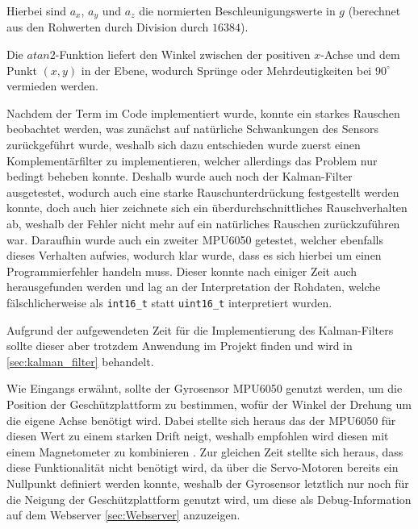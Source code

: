 Hierbei sind $a_x$, $a_y$ und $a_z$ die normierten Beschleunigungswerte in $\mathit{g}$ (berechnet aus den Rohwerten durch Division durch $16384$). 

Die $atan2$-Funktion liefert den Winkel zwischen der positiven $x$-Achse und dem Punkt $(x, y)$ in der Ebene, wodurch Sprünge oder Mehrdeutigkeiten bei $90^\circ$ vermieden werden. \cite{raspberry_matlab_atan2}

Nachdem der Term im Code implementiert wurde, konnte ein starkes Rauschen beobachtet werden, was zunächst auf natürliche Schwankungen des Sensors zurückgeführt wurde, weshalb sich dazu entschieden wurde zuerst einen Komplementärfilter zu implementieren,
welcher allerdings das Problem nur bedingt beheben konnte. Deshalb wurde auch noch der Kalman-Filter ausgetestet, wodurch auch eine starke  Rauschunterdrückung festgestellt werden konnte, doch auch hier zeichnete sich ein überdurchschnittliches Rauschverhalten ab, weshalb der Fehler nicht mehr auf ein natürliches Rauschen zurückzuführen war.
Daraufhin wurde auch ein zweiter MPU6050 getestet, welcher ebenfalls dieses Verhalten aufwies, wodurch klar wurde, dass es sich hierbei um einen Programmierfehler handeln muss. Dieser konnte nach einiger Zeit auch herausgefunden werden und lag an der Interpretation der Rohdaten, 
welche fälschlicherweise als \texttt{int16\_t} statt \texttt{uint16\_t} interpretiert wurden.

Aufgrund der aufgewendeten Zeit für die Implementierung des Kalman-Filters sollte dieser aber trotzdem Anwendung im Projekt finden und wird in \ref{sec:kalman_filter} behandelt.

Wie Eingangs erwähnt, sollte der Gyrosensor MPU6050 genutzt werden, um die Position der Geschützplattform zu bestimmen, wofür der Winkel der Drehung um die eigene Achse benötigt wird. Dabei stellte sich heraus das der MPU6050 für diesen Wert zu einem starken Drift neigt, weshalb empfohlen wird diesen mit einem Magnetometer zu kombinieren \cite[S. 26]{raspberry_invensense_mpu6050_datasheet}.
Zur gleichen Zeit stellte sich heraus, dass diese Funktionalität nicht benötigt wird, da über die Servo-Motoren bereits ein Nullpunkt definiert werden konnte, weshalb der Gyrosensor letztlich nur noch für die Neigung der Geschützplattform genutzt wird, um diese als Debug-Information auf dem Webserver \ref{sec:Webserver} anzuzeigen.

